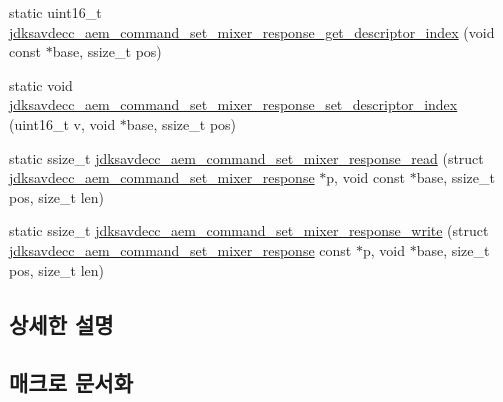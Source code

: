 \begin{DoxyCompactItemize}
\item 
static uint16\+\_\+t \hyperlink{group__command__set__mixer__response_ga817f166402231e460d04805cca712c23}{jdksavdecc\+\_\+aem\+\_\+command\+\_\+set\+\_\+mixer\+\_\+response\+\_\+get\+\_\+descriptor\+\_\+index} (void const $\ast$base, ssize\+\_\+t pos)
\item 
static void \hyperlink{group__command__set__mixer__response_ga16867423aaab6f8af6a9507d62f6aac4}{jdksavdecc\+\_\+aem\+\_\+command\+\_\+set\+\_\+mixer\+\_\+response\+\_\+set\+\_\+descriptor\+\_\+index} (uint16\+\_\+t v, void $\ast$base, ssize\+\_\+t pos)
\item 
static ssize\+\_\+t \hyperlink{group__command__set__mixer__response_ga68899953f5b89b0cf5c2a015ad21548c}{jdksavdecc\+\_\+aem\+\_\+command\+\_\+set\+\_\+mixer\+\_\+response\+\_\+read} (struct \hyperlink{structjdksavdecc__aem__command__set__mixer__response}{jdksavdecc\+\_\+aem\+\_\+command\+\_\+set\+\_\+mixer\+\_\+response} $\ast$p, void const $\ast$base, ssize\+\_\+t pos, size\+\_\+t len)
\item 
static ssize\+\_\+t \hyperlink{group__command__set__mixer__response_ga26880a17f917f7903977144621bd93ec}{jdksavdecc\+\_\+aem\+\_\+command\+\_\+set\+\_\+mixer\+\_\+response\+\_\+write} (struct \hyperlink{structjdksavdecc__aem__command__set__mixer__response}{jdksavdecc\+\_\+aem\+\_\+command\+\_\+set\+\_\+mixer\+\_\+response} const $\ast$p, void $\ast$base, size\+\_\+t pos, size\+\_\+t len)
\end{DoxyCompactItemize}


\subsection{상세한 설명}


\subsection{매크로 문서화}
